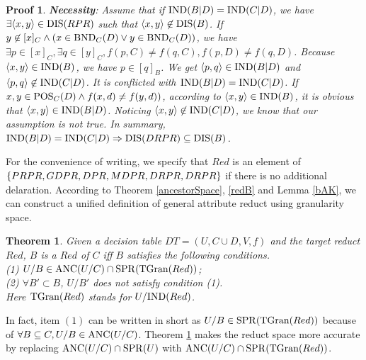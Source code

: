 \documentclass[review]{elsarticle}
\newtheorem{myTheo}{Theorem}
\newtheorem*{myPrf}{Proof}
\begin{document}
\begin{myPrf}
			\textbf{Necessity}: Assume that if ${\rm IND}(B|D)={\rm IND}(C|D)$, we have $\exists \langle x,y\rangle  \in {\rm DIS}(RPR)$ such that $\langle x,y\rangle  \not \in {\rm DIS}(B)$. If $y \not \in [x]_C \wedge(x \in {\rm BND}_C(D) \vee y \in {\rm BND}_C(D))$, we have $\exists p\in[x]_C,\exists q\in[y]_C, f(p,C) \neq f(q,C), f(p,D) \neq f(q,D)$. Because $\langle x,y\rangle  \in {\rm IND}(B)$, we have $p \in [q]_B$. We get $\langle p,q\rangle \in {\rm IND}(B|D)$ and$ \langle p,q\rangle \not \in {\rm IND}(C|D)$. It is conflicted with ${\rm IND}(B|D)={\rm IND}(C|D)$. If $x,y \in {\rm POS}_C(D) \wedge f(x,d) \neq f(y,d))$, according to  $\langle x,y\rangle  \in {\rm IND}(B)$, it is obvious that $\langle x,y\rangle \in {\rm IND}(B|D)$. Noticing $\langle x,y\rangle \not \in {\rm IND}(C|D)$, we know that our assumption is not true. In summary, ${\rm IND}(B|D) = {\rm IND}(C|D) \Rightarrow {\rm DIS}(DRPR) \subseteq {\rm DIS}(B)$.\\
		\end{myPrf}
		\noindent For the convenience of writing, we specify that $Red$ is an element of $\{PRPR, \\GDPR, DPR, MDPR, DRPR, DRPR\}$ if there is no additional delaration. According to Theorem \ref{ancestorSpace}, \ref{redB} and Lemma \ref{bAK}, we can construct a unified definition of general attribute reduct using granularity space.
		\begin{myTheo}\label{generalReduct}
			Given a decision table $DT=(U,C\cup D,V,f)$ and the target reduct $Red$, $B$ is a $Red$ of $C$ iff $B$ satisfies the following conditions.
			\\{\rm(1)} $U/B \in {\rm ANC}(U/C) \cap {\rm SPR}({\rm TGran}(Red))$;
			\\{\rm(2)} $\forall B' \subset B$, $U/B'$ does not satisfy condition {\rm (1)}.\\
			Here ${\rm TGran}(Red)$ stands for $U/{\rm IND}(Red)$.
		\end{myTheo}
		\noindent In fact, item $(1)$ can be written in short as $U/B \in {\rm SPR}({\rm TGran}(Red))$ because of $\forall B \subseteq C, U/B \in {\rm ANC}(U/C)$. Theorem \ref{generalReduct} makes the reduct space more accurate by replacing ${\rm ANC}(U/C) \cap {\rm SPR}(U)$ with ${\rm ANC}(U/C) \cap {\rm SPR}({\rm TGran}(Red))$. 
\end{document}
